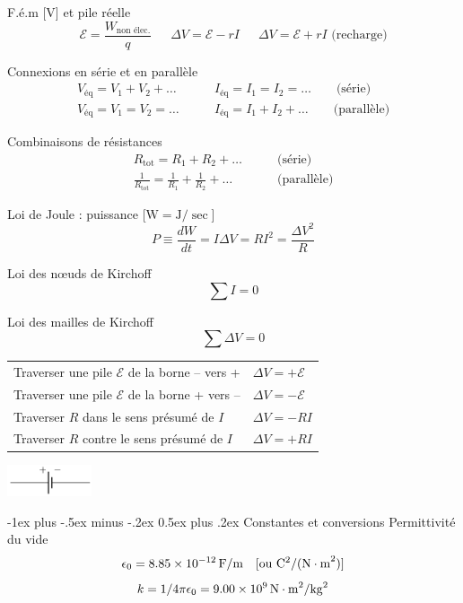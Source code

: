 \documentclass[10pt,landscape]{article}
\makeatletter
\renewcommand{\section}{\@startsection{section}{1}{0mm}%
                                {-1ex plus -.5ex minus -.2ex}%
                                {0.5ex plus .2ex}%
                                {\normalfont\large\bfseries}}
\newcommand{\tableindent}{\hspace{1.5em}}
\newcommand{\emf}{\ensuremath{\mathcal{E}}}
\makeatother
\begin{document}
\begin{multicols}{3}
F.é.m [\si{\volt}] et pile réelle
\[ \emf = \frac{W_\text{non élec.}}{q} \quad\enspace
\Delta V = \emf - rI 
\quad\enspace
\Delta V = \emf + rI \text{ (recharge)}\]

Connexions en série et en parallèle
\begin{align*}
	V_\text{éq} = V_1 + V_2 + \dots  & \qquad
		I_\text{éq} = I_1 = I_2 = \dots   \qquad
		\text{(série)} \\
	V_\text{éq} = V_1 = V_2 = \dots  & \qquad
		I_\text{éq} = I_1 + I_2 + \dots   \qquad
		\text{(parallèle)}
\end{align*}

Combinaisons de résistances
\begin{align*}
R_\text{tot} = R_1 + R_2 + \dots \qquad & \text{(série)} \\
\frac{1}{R_\text{tot}} = \frac{1}{R_1} + \frac{1}{R_2} + \dots \qquad & \text{(parallèle)}
\end{align*}

Loi de Joule : puissance [$\si{\watt} = \si{\joule}/\si{\sec}$]
\[ P \equiv \frac{dW}{dt} = I \Delta V = R I^2  = \frac{\Delta V^2}{R}\]

Loi des nœuds de Kirchoff
\[ \sum I = 0 \]

Loi des mailles de Kirchoff
\[ \sum \Delta V = 0 \]

\begin{tabular}{@{\tableindent}ll@{}}
	Traverser une pile $\emf$ de la borne -- vers + & $\Delta V  = +\emf$ \\
	Traverser une pile $\emf$ de la borne + vers -- & $\Delta V  = -\emf$ \\
 	Traverser $R$ dans le sens présumé de $I$ & $\Delta V  = -RI$ \\
	Traverser $R$ contre le sens présumé de $I$ & $\Delta V  = +RI$ 
\end{tabular}

\begin{center}
	\includegraphics[width=25mm]{./phy1522/pile.png}
\end{center}

\hrulefill
\section{Constantes et conversions}
Permittivité du vide
\[ 	\epsilon_0 = \SI{8,85E-12}{{\farad}/{\meter}} \quad [\text{ou } \si{{\coulomb^2}/{(\newton\cdot\meter^2)}}] \]
\[	k = {1}/{4\pi\epsilon_0} = \SI{9,00E9}{\newton\cdot\meter^2/\kilogram^2}\]


\end{multicols}
\end{document}
